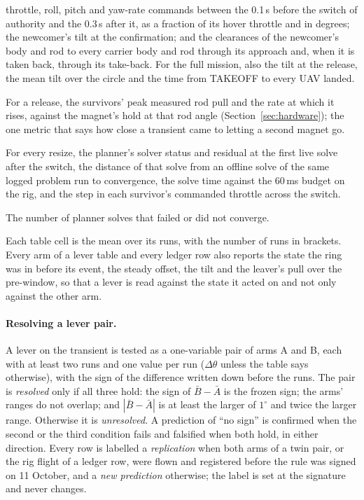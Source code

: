 \begin{description}
    throttle, roll, pitch and yaw-rate commands between the 0.1\,s before the switch of authority and the 0.3\,s
    after it, as a fraction of its hover throttle and in degrees; the newcomer's tilt at the confirmation; and the
    clearances of the newcomer's body and rod to every carrier body and rod through its approach and, when it is
    taken back, through its take-back. For the full mission, also the tilt at the release, the mean tilt over the
    circle and the time from TAKEOFF to every UAV landed.
    \item[Magnet margin] For a release, the survivors' peak measured rod pull and the rate at which it rises,
    against the magnet's hold at that rod angle (Section~\ref{sec:hardware}); the one metric that says how close a
    transient came to letting a second magnet go.
    \item[Switch validation] For every resize, the planner's solver status and residual at the first live solve
    after the switch, the distance of that solve from an offline solve of the same logged problem run to
    convergence, the solve time against the 60\,ms budget on the rig, and the step in each survivor's commanded
    throttle across the switch.
    \item[Solver health] The number of planner solves that failed or did not converge.
\end{description}
Each table cell is the mean over its runs, with the number of runs in brackets. Every arm of a lever table and
every ledger row also reports the state the ring was in before its event, the steady offset, the tilt and the
leaver's pull over the pre-window, so that a lever is read against the state it acted on and not only against
the other arm.

\paragraph{Resolving a lever pair.} A lever on the transient is tested as a one-variable pair of arms A and B,
each with at least two runs and one value per run ($\Delta\theta$ unless the table says otherwise), with the
sign of the difference written down before the runs. The pair is \emph{resolved} only if all three hold: the
sign of $\bar{B}-\bar{A}$ is the frozen sign; the arms' ranges do not overlap; and $|\bar{B}-\bar{A}|$ is at
least the larger of $1^\circ$ and twice the larger range. Otherwise it is \emph{unresolved}. A prediction of
``no sign'' is confirmed when the second or the third condition fails and falsified when both hold, in either
direction. Every row is labelled a \emph{replication} when both arms of a twin pair, or the rig flight of a
ledger row, were flown and registered before the rule was signed on 11 October, and a \emph{new prediction}
otherwise; the label is set at the signature and never changes.

